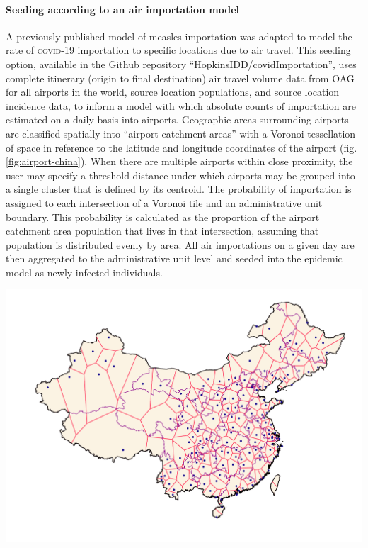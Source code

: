 \paragraph{Seeding according to an air importation model} A previously published model of measles importation was adapted to model the rate of \textsc{covid}-19 importation to specific locations due to air travel\cite{Truelove:EpidemicsAirTravel:2020}. This seeding option, available in the Github repository “\url{HopkinsIDD/covidImportation}”\cite{Truelove:HopkinsIDDCovidImportationInitial:2020}, uses complete itinerary (origin to final destination) air travel volume data from OAG\cite{OAG:FlightDataOAG:2020} for all airports in the world, source location populations, and source location incidence data, to inform a model with which absolute counts of importation are estimated on a daily basis into airports. 
Geographic areas surrounding airports are classified spatially into “airport catchment areas” with a Voronoi tessellation of space in reference to the latitude and longitude coordinates of the airport\cite{Balcan:ModelingSpatialSpread:2010} (fig. \ref{fig:airport-china}). When there are multiple airports within close proximity, the user may specify a threshold distance under which airports may be grouped into a single cluster that is defined by its centroid. The probability of importation is assigned to each intersection of a Voronoi tile and an administrative unit boundary. This probability is calculated as the proportion of the airport catchment area population that lives in that intersection, assuming that population is distributed evenly by area. All air importations on a given day are then aggregated to the administrative unit level and seeded into the epidemic model as newly infected individuals.

 \begin{marginfigure}%
\centering
\includegraphics{fig_pipeline/airport_tessellation.pdf}
\label{fig:airport-china}
\end{marginfigure}

